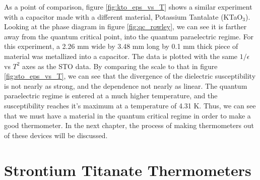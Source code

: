 \documentclass{thesis-umich}
\begin{document}
As a point of comparison, figure \ref{fig:kto_eps_vs_T} shows a similar experiment with a capacitor made with a different material, Potassium Tantalate (KTaO$_3$). Looking at the phase diagram in figure \ref{fig:qc_rowley}, we can see it is farther away from the quantum critical point, into the quantum paraelectric regime. For this experiment, a 2.26 mm wide by 3.48 mm long by 0.1 mm thick piece of material was metallized into a capacitor. The data is plotted with the same $1/\epsilon$ vs $T^2$ axes as the STO data. By comparing the scale to that in figure \ref{fig:sto_eps_vs_T}, we can see that the divergence of the dielectric susceptibility is not nearly as strong, and the dependence not nearly as linear. The quantum paraelectric regime is entered at a much higher temperature, and the susceptibility reaches it's maximum at a temperature of 4.31 K. Thus, we can see that we must have a material in the quantum critical regime in order to make a good thermometer. In the next chapter, the process of making thermometers out of these devices will be discussed. 

\section{Strontium Titanate Thermometers}
\end{document}
